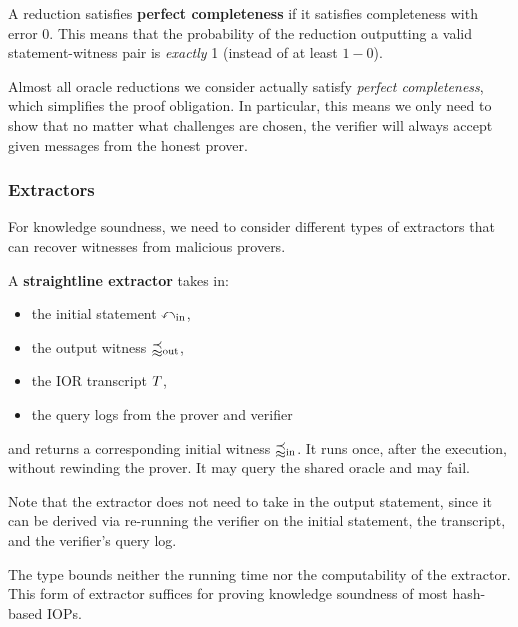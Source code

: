 \begin{definition}
    \label{def:perfect_completeness}
    A reduction satisfies \textbf{perfect completeness} if it satisfies completeness with error \(0\).
    This means that the probability of the reduction outputting a valid statement-witness pair is
    \emph{exactly} 1 (instead of at least \(1 - 0\)).
    \leanok
\end{definition}

Almost all oracle reductions we consider actually satisfy \emph{perfect completeness}, which
simplifies the proof obligation. In particular, this means we only need to show that no matter what challenges are chosen, the verifier will always accept given messages from the honest prover.

\subsubsection{Extractors}

For knowledge soundness, we need to consider different types of extractors that can recover witnesses from malicious provers.

\begin{definition}
    \label{def:straightline_extractor}
    A \textbf{straightline extractor} takes in:
    \begin{itemize}
        \item the initial statement \(\mathbb{x}_{\text{in}}\),
        \item the output witness \(\mathbb{w}_{\text{out}}\),
        \item the IOR transcript \(T\),
        \item the query logs from the prover and verifier
    \end{itemize}
    and returns a corresponding initial witness \(\mathbb{w}_{\text{in}}\). It runs once, after the
    execution, without rewinding the prover. It may query the shared oracle and may fail.

    Note that the extractor does not need to take in the output statement, since it can be derived
    via re-running the verifier on the initial statement, the transcript, and the verifier's query
    log.

    The type bounds neither the running time nor the computability of the extractor. This form of
    extractor suffices for proving knowledge soundness of most hash-based IOPs.
    \leanok
\end{definition}

